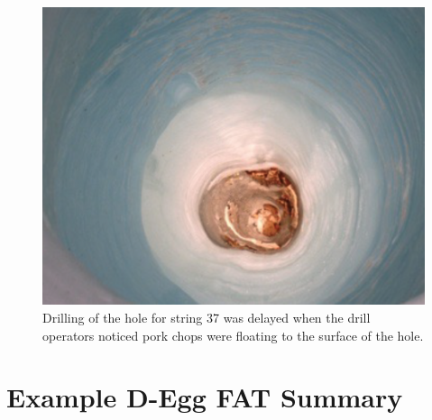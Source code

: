 \documentclass[main.tex]{subfiles}
\begin{document}
\begin{figure}
    \centering
    \includegraphics[width=0.6\linewidth]{figures/porkchops.png}
    \caption{Drilling of the hole for string 37 was delayed when the drill operators noticed pork chops were floating to the surface of the hole.}\label{fig:pork}
\end{figure}

\section{Example D-Egg FAT Summary}\label{append:degg_fat}


\end{document}
